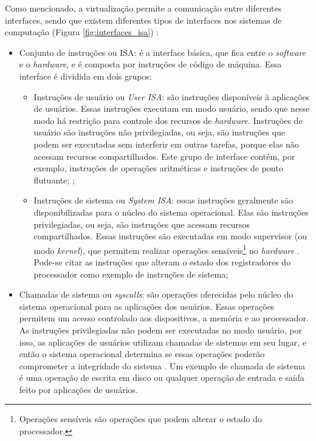 Como mencionado, a virtualização permite a comunicação entre diferentes interfaces, sendo que existem diferentes tipos de interfaces
nos sistemas de computação (Figura \ref{fig:interfaces_isa}) \cite{maziero2013}:
\begin{itemize}
 \item Conjunto de instruções ou \ac{ISA}: é a interface básica, que fica entre o \textit{software} e o \textit{hardware}, e é composta por 
 instruções de código de máquina. Essa interface é dividida em dois grupos:
 \begin{itemize}
  \item Instruções de usuário ou \textit{User \ac{ISA}}: são instruções disponíveis à aplicações de usuários. Essas instruções executam em 
  modo usuário, sendo que nesse modo há restrição para controle dos recursos de \textit{hardware}. Instruções de usuário são instruções 
  não privilegiadas, ou seja, são instruções que podem ser executadas sem interferir em outras tarefas, porque elas não acessam recursos 
  compartilhados. Este grupo de interface contém, por exemplo, instruções de operações aritméticas e instruções de ponto flutuante; 
  \cite{buyya2013};
  \item Instruções de sistema ou \textit{System \ac{ISA}}: essas instruções geralmente são disponibilizadas para o núcleo do sistema operacional. 
  Elas são instruções privilegiadas, ou seja, são instruções que acessam recursos compartilhados. Essas instruções são executadas em modo 
  supervisor (ou modo \textit{kernel}), que permitem realizar operações sensíveis\footnote{Operações sensíveis são operações que podem alterar o 
  estado do processador.} no \textit{hardware} \cite{buyya2013}. Pode-se citar as instruções que alteram o estado dos registradores do processador 
  como exemplo de instruções de sistema; %
 \end{itemize}
 \item Chamadas de sistema ou \textit{syscalls}: são operações oferecidas pelo núcleo do sistema operacional para as aplicações dos usuários.
 Essas operações permitem um acesso controlado aos dispositivos, a memória e ao processador. 
 As instruções privilegiadas não podem ser executadas no modo usuário, por isso, as aplicações de usuários utilizam chamadas de sistemas em seu 
 lugar, e então o sistema operacional determina se essas operações poderão comprometer a integridade do sistema \cite{marinescu2013}.
 Um exemplo de chamada de sistema é uma operação de escrita em disco ou qualquer operação de entrada e saída feito por aplicações de usuários.
\end{itemize}

